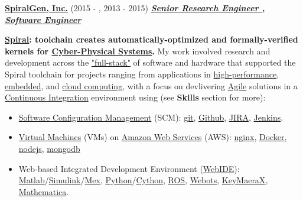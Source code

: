 \documentclass{article}
\newcommand{\employer}[3]{{ \textbf{#1} (#2) \underline{\textbf{\emph{#3}}}\\  }}
\begin{document}
\employer{\href{http://spiralgen.com/}{SpiralGen, Inc.}}{2015 - , 2013 - 2015}{Senior Research Engineer , Software Engineer}


\vspace{1mm}
\textbf{\href{http://spiral.net/}{Spiral}: toolchain creates automatically-optimized  and formally-verified kernels for \href{https://en.wikipedia.org/wiki/Cyber-physical_system}{Cyber-Physical Systems}.} My work involved research and development across the \href{https://www.google.com/search?q=full+stack+software&oq=full+stack+software&aqs=chrome..69i57.2623j0j7&sourceid=chrome&es_sm=122&ie=UTF-8}{"full-stack"} of software and hardware that supported the Spiral toolchain for projects ranging from applications in \href{https://en.wikipedia.org/wiki/Supercomputer}{high-performance}, \href{https://en.wikipedia.org/wiki/Embedded_system}{embedded}, and \href{https://en.wikipedia.org/wiki/Cloud_computing}{cloud computing}, with a focus on devlivering \href{https://en.wikipedia.org/wiki/Agile_software_development}{Agile} solutions in a \href{http://en.wikipedia.org/wiki/Continuous_integration}{Continuous Integration} environment using (see \textbf{Skills} section for more):

    \begin{itemize}
      \item \href{https://en.wikipedia.org/wiki/Software_configuration_management}{Software Configuration Management} (SCM): \href{https://git-scm.com/}{git}, \href{https://github.com/spiralgen}{Github}, \href{https://www.atlassian.com/software/jira}{JIRA}, \href{http://jenkins-ci.org/}{Jenkins}.
      \item \href{https://en.wikipedia.org/wiki/Virtual_machine}{Virtual Machines} (VMs) on \href{https://en.wikipedia.org/wiki/Amazon_Web_Services}{Amazon Web Services} (AWS): \href{https://www.nginx.com/resources/wiki/}{nginx}, \href{https://www.docker.com/}{Docker}, \href{https://nodejs.org/en/}{nodejs}, \href{https://www.mongodb.org/}{mongodb}
      \item Web-based Integrated Development Environment (\href{https://www.google.com/search?q=webide&oq=webide&aqs=chrome..69i57j0l5.813j0j7&sourceid=chrome&es_sm=122&ie=UTF-8#q=browser+ide}{WebIDE}): \href{http://www.mathworks.com/products/matlab/}{Matlab}/\href{http://www.mathworks.com/products/simulink/}{Simulink}/\href{http://www.mathworks.com/help/matlab/ref/mex.html}{Mex}, \href{https://www.python.org/}{Python}/\href{http://cython.org/}{Cython}, \href{http://www.ros.org/}{ROS}, \href{https://www.cyberbotics.com/overview}{Webots}, \href{http://www.ls.cs.cmu.edu/KeYmaeraX/}{KeyMaeraX}, \href{http://www.wolfram.com/mathematica/}{Mathematica}. 
    \end{itemize}
\end{document}
